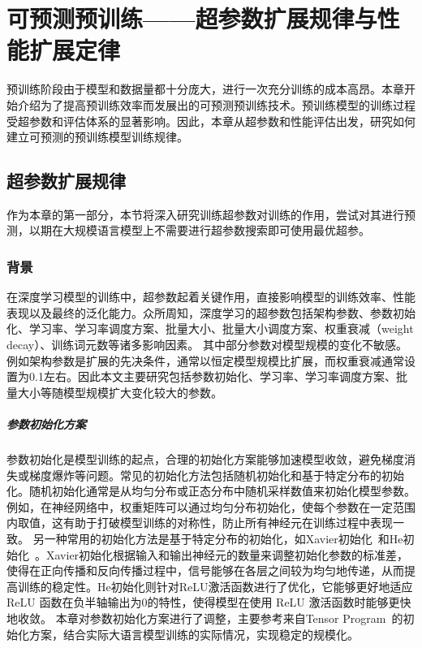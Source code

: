 
\chapter{可预测预训练——超参数扩展规律与性能扩展定律}

预训练阶段由于模型和数据量都十分庞大，进行一次充分训练的成本高昂。本章开始介绍为了提高预训练效率而发展出的可预测预训练技术。预训练模型的训练过程受超参数和评估体系的显著影响。因此，本章从超参数和性能评估出发，研究如何建立可预测的预训练模型训练规律。

\section{超参数扩展规律}
作为本章的第一部分，本节将深入研究训练超参数对训练的作用，尝试对其进行预测，以期在大规模语言模型上不需要进行超参数搜索即可使用最优超参。

\subsection{背景}

在深度学习模型的训练中，超参数起着关键作用，直接影响模型的训练效率、性能表现以及最终的泛化能力。众所周知，深度学习的超参数包括架构参数、参数初始化、学习率、学习率调度方案、批量大小、批量大小调度方案、权重衰减（weight decay）、训练词元数等诸多影响因素。
其中部分参数对模型规模的变化不敏感。例如架构参数是扩展的先决条件，通常以恒定模型规模比扩展，而权重衰减通常设置为0.1左右。因此本文主要研究包括参数初始化、学习率、学习率调度方案、批量大小等随模型规模扩大变化较大的参数。

\paragraph{参数初始化方案}
参数初始化是模型训练的起点，合理的初始化方案能够加速模型收敛，避免梯度消失或梯度爆炸等问题。常见的初始化方法包括随机初始化和基于特定分布的初始化。随机初始化通常是从均匀分布或正态分布中随机采样数值来初始化模型参数。例如，在神经网络中，权重矩阵可以通过均匀分布初始化，使每个参数在一定范围内取值，这有助于打破模型训练的对称性，防止所有神经元在训练过程中表现一致。
另一种常用的初始化方法是基于特定分布的初始化，如Xavier初始化~\cite{pmlr-v9-glorot10a}和He初始化~\cite{he2015delving}。Xavier初始化根据输入和输出神经元的数量来调整初始化参数的标准差，使得在正向传播和反向传播过程中，信号能够在各层之间较为均匀地传递，从而提高训练的稳定性。He初始化则针对ReLU激活函数进行了优化，它能够更好地适应 ReLU 函数在负半轴输出为0的特性，使得模型在使用 ReLU 激活函数时能够更快地收敛。
本章对参数初始化方案进行了调整，主要参考来自Tensor Program~\cite{yang2022tensor}的初始化方案，结合实际大语言模型训练的实际情况，实现稳定的规模化。


